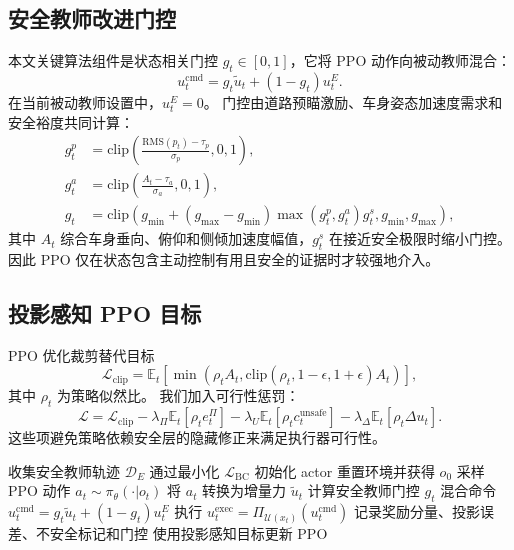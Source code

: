 \documentclass[UTF8,letterpaper,twocolumn]{ctexart}
\begin{document}
\subsection{安全教师改进门控}

本文关键算法组件是状态相关门控 $g_t \in [0,1]$，它将 PPO 动作向被动教师混合：
\begin{equation}
    u^{\mathrm{cmd}}_t
    =
    g_t \tilde{u}_t + (1-g_t)u^{E}_t.
\end{equation}
在当前被动教师设置中，$u^E_t=0$。
门控由道路预瞄激励、车身姿态加速度需求和安全裕度共同计算：
\begin{align}
    g^{p}_t &= \mathrm{clip}\left(
        \frac{\mathrm{RMS}(p_t)-\tau_p}{\sigma_p},0,1
    \right),\\
    g^{a}_t &= \mathrm{clip}\left(
        \frac{A_t-\tau_a}{\sigma_a},0,1
    \right),\\
    g_t &= \mathrm{clip}\left(
        g_{\min} + (g_{\max}-g_{\min})
        \max(g^{p}_t,g^{a}_t)g^{s}_t,
        g_{\min},g_{\max}
    \right),
\end{align}
其中 $A_t$ 综合车身垂向、俯仰和侧倾加速度幅值，$g^s_t$ 在接近安全极限时缩小门控。
因此 PPO 仅在状态包含主动控制有用且安全的证据时才较强地介入。

\subsection{投影感知 PPO 目标}

PPO 优化裁剪替代目标
\begin{equation}
    \mathcal{L}_{\mathrm{clip}}
    =
    \mathbb{E}_t
    \left[
    \min(\rho_t A_t,\mathrm{clip}(\rho_t,1-\epsilon,1+\epsilon)A_t)
    \right],
\end{equation}
其中 $\rho_t$ 为策略似然比。
我们加入可行性惩罚：
\begin{equation}
    \mathcal{L}
    =
    \mathcal{L}_{\mathrm{clip}}
    -
    \lambda_\Pi \mathbb{E}_t[\rho_t e^\Pi_t]
    -
    \lambda_U \mathbb{E}_t[\rho_t c^{\mathrm{unsafe}}_t]
    -
    \lambda_\Delta \mathbb{E}_t[\rho_t \Delta u_t].
\end{equation}
这些项避免策略依赖安全层的隐藏修正来满足执行器可行性。

\begin{algorithm}[t]
\caption{STG-PPO 在线适应}
\label{alg:stgppo_zh}
\begin{algorithmic}[1]
\STATE 收集安全教师轨迹 $\mathcal{D}_E$
\STATE 通过最小化 $\mathcal{L}_{\mathrm{BC}}$ 初始化 actor
    \STATE 重置环境并获得 $o_0$
        \STATE 采样 PPO 动作 $a_t \sim \pi_\theta(\cdot|o_t)$
        \STATE 将 $a_t$ 转换为增量力 $\tilde{u}_t$
        \STATE 计算安全教师门控 $g_t$
        \STATE 混合命令 $u^{\mathrm{cmd}}_t=g_t\tilde{u}_t+(1-g_t)u^E_t$
        \STATE 执行 $u^{\mathrm{exec}}_t=\Pi_{\mathcal{U}(x_t)}(u^{\mathrm{cmd}}_t)$
        \STATE 记录奖励分量、投影误差、不安全标记和门控
    \ENDFOR
    \STATE 使用投影感知目标更新 PPO
\ENDFOR
\end{algorithmic}
\end{algorithm}
\end{document}
